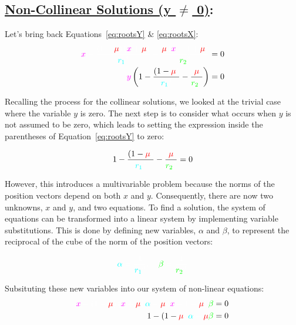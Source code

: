 \subsection*{\underline{Non-Collinear Solutions (y $\neq$ 0)}:}

Let's bring back Equations~\eqref{eq:rootsY} \& \eqref{eq:rootsX}:
\begin{align*}
    \cm x \cw - \ddfrac{\left(1 - \cred \mu \cw \right) \left(\cm x \cw + \cred \mu \cw\right)}{\cc r_1 \cw ^3} - \ddfrac{\cred \mu \cw \left(\cm x \cw - 1 + \cred\mu\cw\right)}{\cg r_2 \cw ^3} & = 0
    \\
    \textcolor{magenta}{y} \left( 1 - \ddfrac{\left(1-\cred\mu\cw\right)}{\cc r_1 \cw ^3} - \ddfrac{\cred\mu\cw}{\cg r_2 \cw ^3} \right)                                                          & = 0
\end{align*}


Recalling the process for the collinear solutions, we looked at the trivial case where the variable $y$ is zero. The next step is to consider what occurs when $y$ is not assumed to be zero, which leads to setting the expression inside the parentheses of Equation~\eqref{eq:rootsY} to zero:

\begin{equation}
    1 - \ddfrac{\left(1-\cred\mu\cw\right)}{\cc r_1 \cw ^3} - \ddfrac{\cred\mu\cw}{\cg r_2 \cw ^3} = 0 \\
\end{equation}

However, this introduces a multivariable problem because the norms of the position vectors depend on both $x$ and $y$. Consequently, there are now two unknowns, $x$ and $y$, and two equations. To find a solution, the system of equations can be transformed into a linear system by implementing variable substitutions. This is done by defining new variables, $\alpha$ and $\beta$, to represent the reciprocal of the cube of the norm of the position vectors:

\begin{equation}
    \cc \alpha \cw = \ddfrac{1}{\cc r_1 \cw ^3}, \quad \cg \beta \cw = \ddfrac{1}{\cg r_2 \cw ^3}
\end{equation}

Subsituting these new variables into our system of non-linear equations:
\begin{align}
    \cm x \cw - \left(1 - \cred \mu \cw \right) \left(\cm x \cw + \cred \mu \cw\right) \cc \alpha \cw
    - \cred \mu \cw \left(\cm x \cw - 1 + \cred\mu\cw\right) \cg \beta \cw    & = 0
    \label{eq:eq9}
    \\
    1 - \left(1-\cred\mu\cw\right) \cc \alpha \cw - \cred\mu\cw \cg \beta \cw & = 0
    \label{eq:eq10}
\end{align}

